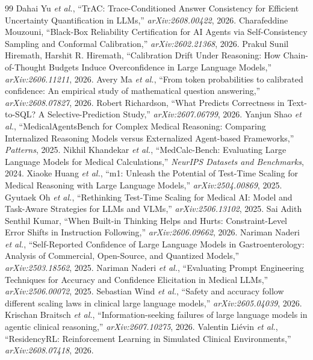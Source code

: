 \documentclass[journal,twoside]{IEEEtran}
\begin{document}
\begin{thebibliography}{99}
 Dahai Yu \emph{et al.}, ``TrAC: Trace-Conditioned Answer Consistency for Efficient Uncertainty Quantification in LLMs,'' \emph{arXiv:2608.00422}, 2026.
 Charafeddine Mouzouni, ``Black-Box Reliability Certification for AI Agents via Self-Consistency Sampling and Conformal Calibration,'' \emph{arXiv:2602.21368}, 2026.
 Prakul Sunil Hiremath, Harshit R. Hiremath, ``Calibration Drift Under Reasoning: How Chain-of-Thought Budgets Induce Overconfidence in Large Language Models,'' \emph{arXiv:2606.11211}, 2026.
 Avery Ma \emph{et al.}, ``From token probabilities to calibrated confidence: An empirical study of mathematical question answering,'' \emph{arXiv:2608.07827}, 2026.
 Robert Richardson, ``What Predicts Correctness in Text-to-SQL? A Selective-Prediction Study,'' \emph{arXiv:2607.06799}, 2026.
 Yanjun Shao \emph{et al.}, ``MedicalAgentsBench for Complex Medical Reasoning: Comparing Internalized Reasoning Models versus Externalized Agent-based Frameworks,'' \emph{Patterns}, 2025.
 Nikhil Khandekar \emph{et al.}, ``MedCalc-Bench: Evaluating Large Language Models for Medical Calculations,'' \emph{NeurIPS Datasets and Benchmarks}, 2024.
 Xiaoke Huang \emph{et al.}, ``m1: Unleash the Potential of Test-Time Scaling for Medical Reasoning with Large Language Models,'' \emph{arXiv:2504.00869}, 2025.
 Gyutaek Oh \emph{et al.}, ``Rethinking Test-Time Scaling for Medical AI: Model and Task-Aware Strategies for LLMs and VLMs,'' \emph{arXiv:2506.13102}, 2025.
 Sai Adith Senthil Kumar, ``When Built-in Thinking Helps and Hurts: Constraint-Level Error Shifts in Instruction Following,'' \emph{arXiv:2606.09662}, 2026.
 Nariman Naderi \emph{et al.}, ``Self-Reported Confidence of Large Language Models in Gastroenterology: Analysis of Commercial, Open-Source, and Quantized Models,'' \emph{arXiv:2503.18562}, 2025.
 Nariman Naderi \emph{et al.}, ``Evaluating Prompt Engineering Techniques for Accuracy and Confidence Elicitation in Medical LLMs,'' \emph{arXiv:2506.00072}, 2025.
 Sebastian Wind \emph{et al.}, ``Safety and accuracy follow different scaling laws in clinical large language models,'' \emph{arXiv:2605.04039}, 2026.
 Krischan Braitsch \emph{et al.}, ``Information-seeking failures of large language models in agentic clinical reasoning,'' \emph{arXiv:2607.10275}, 2026.
 Valentin Liévin \emph{et al.}, ``ResidencyRL: Reinforcement Learning in Simulated Clinical Environments,'' \emph{arXiv:2608.07418}, 2026.

\end{thebibliography}
\end{document}
